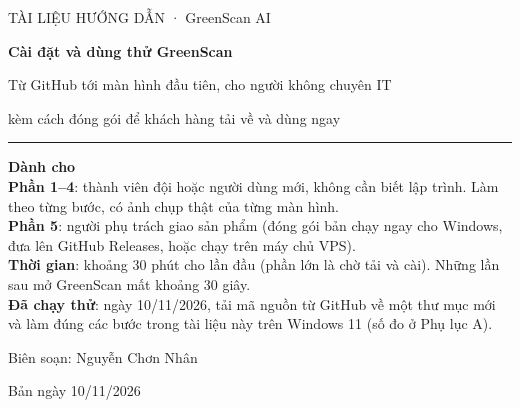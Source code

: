 \documentclass[12pt,a4paper,oneside]{report}
\newcommand{\tacgia}{Nguyễn Chơn Nhân}
\newcommand{\tensp}{GreenScan AI}
\begin{document}
\begin{titlepage}
\centering
{\headfont\color{gsteal}\fontsize{13}{16}\selectfont TÀI LIỆU HƯỚNG DẪN · \tensp\par}
\vspace{2.2cm}
{\headfont\bfseries\color{ink}\fontsize{28}{34}\selectfont Cài đặt và dùng thử GreenScan\par}
\vspace{0.4cm}
{\headfont\color{ink}\fontsize{16}{21}\selectfont Từ GitHub tới màn hình đầu tiên, cho người không chuyên IT\par}
\vspace{0.3cm}
{\headfont\color{muted}\fontsize{13}{17}\selectfont kèm cách đóng gói để khách hàng tải về và dùng ngay\par}
\vspace{1.4cm}
{\color{gsteal}\rule{0.55\linewidth}{1.1pt}\par}
\vspace{1.2cm}
\begin{minipage}{0.82\linewidth}\raggedright\linespread{1.3}\selectfont
\textbf{Dành cho}\\
\textbf{Phần 1--4}: thành viên đội hoặc người dùng mới, không cần biết lập trình. Làm theo từng bước, có ảnh chụp thật của từng màn hình.\\[4pt]
\textbf{Phần 5}: người phụ trách giao sản phẩm (đóng gói bản chạy ngay cho Windows, đưa lên GitHub Releases, hoặc chạy trên máy chủ VPS).\\[10pt]
\textbf{Thời gian}: khoảng 30 phút cho lần đầu (phần lớn là chờ tải và cài). Những lần sau mở GreenScan mất khoảng 30 giây.\\[10pt]
\textbf{Đã chạy thử}: ngày 10/11/2026, tải mã nguồn từ GitHub về một thư mục mới và làm đúng các bước trong tài liệu này trên Windows 11 (số đo ở Phụ lục A).
\end{minipage}
\vfill
{\large Biên soạn: \tacgia\par}
\vspace{4pt}
{\color{muted}Bản ngày 10/11/2026\par}
\restoregeometry
\end{titlepage}

\begingroup\linespread{1.0}\selectfont\setlength{\cftbeforechapskip}{4pt}
\tableofcontents
\endgroup
\clearpage

\end{document}
